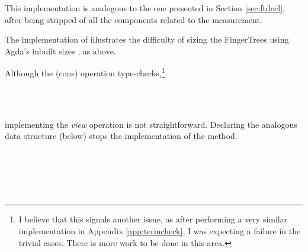 \documentclass[12pt,twoside,notitlepage]{report}
\begin{document}
This implementation is analogous to the one presented in Section \ref{sec:ftdecl}, after being stripped of all the components related to the measurement.  

The implementation of  illustrates the difficulty of sizing the FingerTrees using Agda's inbuilt sizes \cite{sizedtypes}, as above.

Although the (cons) operation type-checks,\footnote{I believe that this signals another issue, as after performing a very similar implementation in Appendix \ref{app:termcheck}, I was expecting a failure in the trivial cases. There is more work to be done in this area.} 

\begin{code}
\\
\> \AgdaSymbol{:}  \AgdaSymbol{\{} \AgdaSymbol{\}} \AgdaSymbol{\{} \AgdaSymbol{:}  \AgdaSymbol{\}}      \AgdaSymbol{\{}\AgdaSymbol{\}}    \AgdaSymbol{\{} \AgdaSymbol{\}}\<%
\\
\end{code}

implementing the \textit{view} operation is not straightforward. Declaring the analogous data structure (below) stops the implementation of the  method.  

\begin{code}
\\
\>  \AgdaSymbol{\{}\AgdaSymbol{\}(} \AgdaSymbol{:}  \AgdaSymbol{)} \AgdaSymbol{:} \AgdaSymbol{\{} \AgdaSymbol{:} \AgdaSymbol{\}}    \<%
\\
\>[0]\<[2]%
\>[2] \AgdaSymbol{:}  \AgdaSymbol{\{}\AgdaSymbol{\}}    \AgdaSymbol{\{} \AgdaSymbol{\}}\<%
\\
\>[0]\<[2]%
\>[2] \AgdaSymbol{:}  \AgdaSymbol{\{}\AgdaSymbol{\}}      \AgdaSymbol{\{}\AgdaSymbol{\}}    \AgdaSymbol{\{} \AgdaSymbol{\}}\<%
\\
\end{code}
\end{document}
